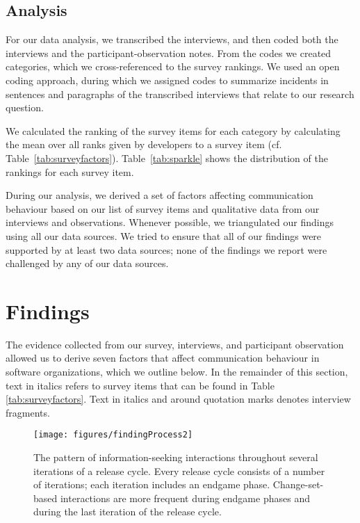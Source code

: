 \subsection{Analysis} 
For our data analysis, we transcribed the interviews, and then coded both the interviews and the participant-observation notes. From the codes we created categories, which we cross-referenced to the survey rankings. We used an open coding approach, during which we assigned codes to summarize incidents in sentences and paragraphs of the transcribed interviews that relate to our research question.

We calculated the ranking of the survey items for each category by calculating the mean over all ranks given by developers to a survey item (cf. Table~\ref{tab:surveyfactors}).
Table~\ref{tab:sparkle} shows the distribution of the rankings for each survey item.

During our analysis, we derived a set of factors affecting communication behaviour based on our list of survey items and qualitative data from our interviews and observations. Whenever possible, we triangulated our findings using all our data sources. We tried to ensure that all of our findings were supported by at least two data sources; none of the findings we report were challenged by any of our data sources. 


\section{Findings}
\label{sec:findings}
The evidence collected from our survey, interviews, and participant observation allowed us to derive seven factors that affect communication behaviour in software organizations, which we outline below. In the remainder of this section, text in italics refers to survey items that can be found in Table \ref{tab:surveyfactors}. Text in italics and around quotation marks denotes interview fragments.

\begin{figure}[tb]
\centering
\texttt{[image: figures/findingProcess2]}
\vspace{-20pt}\caption{The pattern of information-seeking interactions throughout several iterations of a release cycle. Every release cycle consists of a number of iterations; each iteration includes an endgame phase. Change-set-based interactions are more frequent during endgame phases and during the last iteration of the release cycle.}
\label{IterationsFig}
\end{figure}



